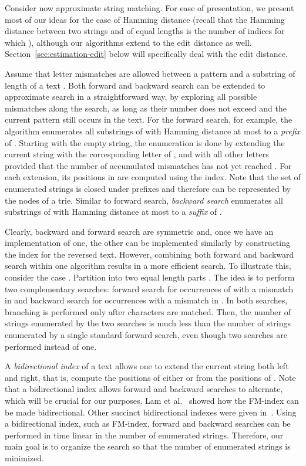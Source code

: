 \documentclass[12pt]{article}
\begin{document}
Consider now approximate string matching. For ease of presentation, we
present most of our ideas for the
case of Hamming distance
(recall that the Hamming distance between two strings  and  of equal
lengths is the number of indices  for which ),
although our algorithms extend to the edit
distance as well. Section~\ref{sec:estimation-edit} below will
specifically deal with the edit distance.

Assume that  letter mismatches are allowed between a pattern  and
a substring of length  of a text .
Both forward and backward search can be extended to
approximate search in a straightforward way, by exploring all
possible mismatches along the search, as long as their number does
not exceed  and the current pattern still occurs in the text.
For the forward search, for example, the algorithm enumerates all
substrings of  with
Hamming distance at most  to a \emph{prefix} of .
Starting with the empty string, the enumeration 
is done by extending the current string with the corresponding letter
of , and with all other letters provided that the number of accumulated
mismatches has not yet reached . For each extension,
its positions in  are computed using the index.
Note that the set of enumerated strings is closed under prefixes and
therefore can be represented by the nodes of a trie.
Similar to forward search, \emph{backward search}
enumerates all substrings of 
with Hamming distance at most  to a \emph{suffix} of .

Clearly, backward and forward search are symmetric and, once we have
an implementation of one, the other can be implemented similarly by constructing the index
for the reversed text. 
However, combining both forward and backward search within one algorithm
results in a more efficient search.
To illustrate this, consider the case .
Partition  into two equal length parts .
The idea is to perform two complementary searches: forward search for
occurrences of  with a mismatch in  and backward search for
occurrences with a mismatch in . In both searches, branching is
performed only after  characters are matched. 
Then,
the number of strings enumerated by the
two searches is much less than the number of strings enumerated by a single
standard forward search, even though two searches are performed instead
of one.

A \emph{bidirectional index} of a text allows one to extend the current
string  both left and right, that is, compute the positions of either
 or  from the positions of .
Note that a bidirectional
index allows forward and backward searches to alternate, which will be
crucial for our purposes. 
Lam et al.~\cite{LamLTWWY09} showed how the FM-index can be made
bidirectional. Other succinct bidirectional indexes were given
in~\cite{RussoEtAlAlgorithms09,SchnattingerOG12,BelazzouguiCKM13}.
Using a bidirectional index, such as FM-index, forward and backward searches can be
performed in time linear in the number of enumerated strings.
Therefore, our main goal is to organize the search so that the number
of enumerated strings is minimized.
\end{document}
